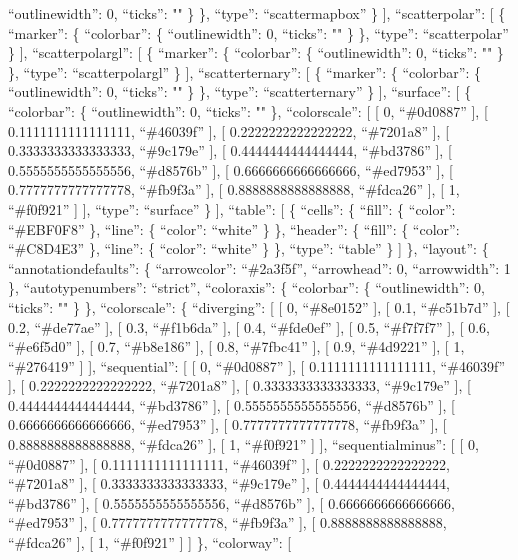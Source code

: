 \documentclass[
]{article}
\begin{document}
``outlinewidth'': 0, ``ticks'': "" \} \}, ``type'': ``scattermapbox'' \}
{]}, ``scatterpolar'': {[} \{ ``marker'': \{ ``colorbar'': \{
``outlinewidth'': 0, ``ticks'': "" \} \}, ``type'': ``scatterpolar'' \}
{]}, ``scatterpolargl'': {[} \{ ``marker'': \{ ``colorbar'': \{
``outlinewidth'': 0, ``ticks'': "" \} \}, ``type'': ``scatterpolargl''
\} {]}, ``scatterternary'': {[} \{ ``marker'': \{ ``colorbar'': \{
``outlinewidth'': 0, ``ticks'': "" \} \}, ``type'': ``scatterternary''
\} {]}, ``surface'': {[} \{ ``colorbar'': \{ ``outlinewidth'': 0,
``ticks'': "" \}, ``colorscale'': {[} {[} 0, ``\#0d0887'' {]}, {[}
0.1111111111111111, ``\#46039f'' {]}, {[} 0.2222222222222222,
``\#7201a8'' {]}, {[} 0.3333333333333333, ``\#9c179e'' {]}, {[}
0.4444444444444444, ``\#bd3786'' {]}, {[} 0.5555555555555556,
``\#d8576b'' {]}, {[} 0.6666666666666666, ``\#ed7953'' {]}, {[}
0.7777777777777778, ``\#fb9f3a'' {]}, {[} 0.8888888888888888,
``\#fdca26'' {]}, {[} 1, ``\#f0f921'' {]} {]}, ``type'': ``surface'' \}
{]}, ``table'': {[} \{ ``cells'': \{ ``fill'': \{ ``color'':
``\#EBF0F8'' \}, ``line'': \{ ``color'': ``white'' \} \}, ``header'': \{
``fill'': \{ ``color'': ``\#C8D4E3'' \}, ``line'': \{ ``color'':
``white'' \} \}, ``type'': ``table'' \} {]} \}, ``layout'': \{
``annotationdefaults'': \{ ``arrowcolor'': ``\#2a3f5f'', ``arrowhead'':
0, ``arrowwidth'': 1 \}, ``autotypenumbers'': ``strict'', ``coloraxis'':
\{ ``colorbar'': \{ ``outlinewidth'': 0, ``ticks'': "" \} \},
``colorscale'': \{ ``diverging'': {[} {[} 0, ``\#8e0152'' {]}, {[} 0.1,
``\#c51b7d'' {]}, {[} 0.2, ``\#de77ae'' {]}, {[} 0.3, ``\#f1b6da'' {]},
{[} 0.4, ``\#fde0ef'' {]}, {[} 0.5, ``\#f7f7f7'' {]}, {[} 0.6,
``\#e6f5d0'' {]}, {[} 0.7, ``\#b8e186'' {]}, {[} 0.8, ``\#7fbc41'' {]},
{[} 0.9, ``\#4d9221'' {]}, {[} 1, ``\#276419'' {]} {]}, ``sequential'':
{[} {[} 0, ``\#0d0887'' {]}, {[} 0.1111111111111111, ``\#46039f'' {]},
{[} 0.2222222222222222, ``\#7201a8'' {]}, {[} 0.3333333333333333,
``\#9c179e'' {]}, {[} 0.4444444444444444, ``\#bd3786'' {]}, {[}
0.5555555555555556, ``\#d8576b'' {]}, {[} 0.6666666666666666,
``\#ed7953'' {]}, {[} 0.7777777777777778, ``\#fb9f3a'' {]}, {[}
0.8888888888888888, ``\#fdca26'' {]}, {[} 1, ``\#f0f921'' {]} {]},
``sequentialminus'': {[} {[} 0, ``\#0d0887'' {]}, {[}
0.1111111111111111, ``\#46039f'' {]}, {[} 0.2222222222222222,
``\#7201a8'' {]}, {[} 0.3333333333333333, ``\#9c179e'' {]}, {[}
0.4444444444444444, ``\#bd3786'' {]}, {[} 0.5555555555555556,
``\#d8576b'' {]}, {[} 0.6666666666666666, ``\#ed7953'' {]}, {[}
0.7777777777777778, ``\#fb9f3a'' {]}, {[} 0.8888888888888888,
``\#fdca26'' {]}, {[} 1, ``\#f0f921'' {]} {]} \}, ``colorway'': {[}
\end{document}
